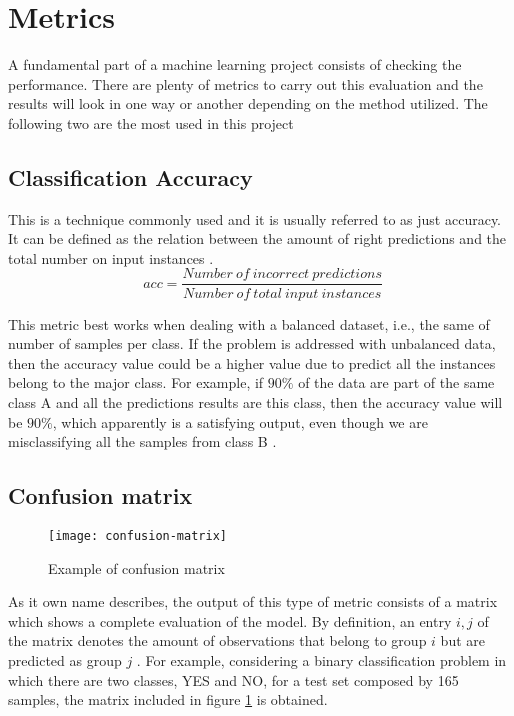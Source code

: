 
\section{Metrics}
\label{appendix:metrics}

	A fundamental part of a machine learning project consists of checking the performance. There are plenty of metrics to carry out this evaluation and the results will look in one way or another depending on the method utilized. The following two are the most used in this project
	
\subsection{Classification Accuracy}

	This is a technique commonly used and it is usually referred to as just accuracy. It can be defined as the relation between the amount of right predictions and the total number on input instances \cite{Scikit-learn}.
	\[
	\ \ acc = \frac{Number\ of\ incorrect\  predictions}{Number\ of\ total\ input\ instances}
	\]
	
	This metric best works when dealing with a balanced dataset, i.e., the same of number of samples per class.
	If the problem is addressed with unbalanced data, then the accuracy value could be a higher value due to predict all the instances belong to the major class. For example, if $90\%$ of the data are part of the same class A and all the predictions results are this class, then the accuracy value will be $90\%$, which apparently is a satisfying output, even though we are misclassifying all the samples from class B \cite{Mishra2018}. 
	
\subsection{Confusion matrix}

	\begin{figure}[b]
		\centering
		\captionsetup{justification=centering}
		\texttt{[image: confusion-matrix]}
		\caption{Example of confusion matrix}
		\label{fig:mesh6}
	\end{figure}

	As it own name describes, the output of this type of metric consists of a matrix which shows a complete evaluation of the model. By definition, an entry $i,j$ of the matrix denotes the amount of observations that belong to group $i$ but are predicted as group $j$ \cite{Scikit-learn}. For example, considering a binary classification problem in which there are two classes, YES and NO, for a test set composed by 165 samples, the matrix included in figure \ref{fig:mesh6} is obtained. 
	
